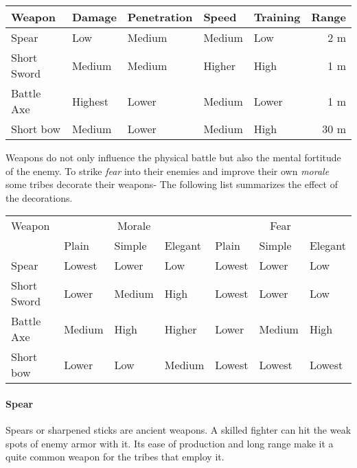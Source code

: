 \documentclass[a4paper]{book}
\begin{document}
\begin{longtable}{lllllr}
	\toprule
	Weapon
	       & Damage  & Penetration
	       & Speed   & Training    & Range \\
	\midrule
	Spear
	       & Low     & Medium
	       & Medium  & Low         & 2 m   \\
	Short Sword
	       & Medium  & Medium
	       & Higher  & High        & 1 m   \\
	Battle Axe
	       & Highest & Lower
	       & Medium  & Lower       & 1 m   \\
	Short bow
	       & Medium  & Lower       &
	Medium & High    & 30 m                \\
	\bottomrule
\end{longtable}

Weapons do not only influence the physical battle but also the mental fortitude
of the enemy. To strike \emph{fear} into their enemies and improve their own
\emph{morale} some tribes decorate their weapons- The following list summarizes
the effect of the decorations.

\begin{longtable}{l ll ll ll}
	\toprule
	Weapon
	 & \multicolumn{3}{c}{Morale}
	 & \multicolumn{3}{c}{Fear}
	\\
	 & Plain                      & Simple & Elegant
	 & Plain                      & Simple & Elegant \\
	\midrule
	Spear
	 & Lowest                     & Lower  & Low
	 & Lowest                     & Lower  & Low     \\
	Short Sword
	 & Lower                      & Medium & High
	 & Lowest                     & Lower  & Low     \\
	Battle Axe
	 & Medium                     & High   & Higher
	 & Lower                      & Medium & High    \\
	Short bow
	 & Lower                      & Low    & Medium
	 & Lowest                     & Lowest & Lowest  \\
	\bottomrule
\end{longtable}

\paragraph{Spear}
Spears or sharpened sticks are ancient weapons. A skilled fighter can hit the
weak spots of enemy armor with it. Its ease of production and long range make
it a quite common weapon for the tribes that employ it.
\end{document}
